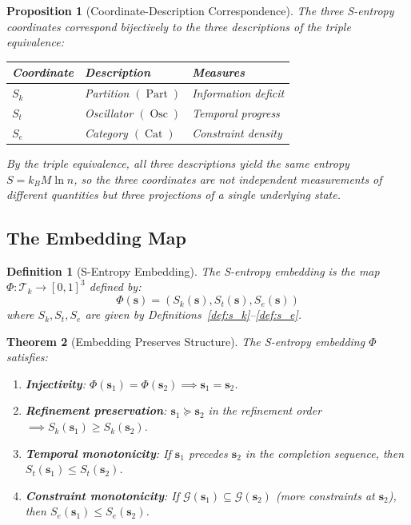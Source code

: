 \documentclass[12pt,twocolumn]{article}
\newtheorem{theorem}{Theorem}[section]
\newtheorem{proposition}[theorem]{Proposition}
\newtheorem{definition}{Definition}[section]
\DeclareMathOperator{\Cat}{Cat}
\DeclareMathOperator{\Part}{Part}
\DeclareMathOperator{\Osc}{Osc}
\begin{document}
\begin{proposition}[Coordinate-Description Correspondence]
\label{prop:correspondence}
The three S-entropy coordinates correspond bijectively to the three descriptions of the triple equivalence:
\begin{center}
\begin{tabular}{lll}
\toprule
Coordinate & Description & Measures \\
\midrule
$S_k$ & Partition $(\Part)$ & Information deficit \\
$S_t$ & Oscillator $(\Osc)$ & Temporal progress \\
$S_e$ & Category $(\Cat)$ & Constraint density \\
\bottomrule
\end{tabular}
\end{center}
By the triple equivalence, all three descriptions yield the same entropy $S = k_B M \ln n$, so the three coordinates are not independent measurements of different quantities but three projections of a single underlying state.
\end{proposition}

\subsection{The Embedding Map}

\begin{definition}[S-Entropy Embedding]
\label{def:embedding}
The \emph{S-entropy embedding} is the map $\Phi: \mathcal{T}_k \to [0,1]^3$ defined by:
\begin{equation}
\label{eq:embedding}
\Phi(\mathbf{s}) = (S_k(\mathbf{s}), S_t(\mathbf{s}), S_e(\mathbf{s}))
\end{equation}
where $S_k, S_t, S_e$ are given by Definitions~\ref{def:s_k}--\ref{def:s_e}.
\end{definition}

\begin{theorem}[Embedding Preserves Structure]
\label{thm:embedding_structure}
The S-entropy embedding $\Phi$ satisfies:
\begin{enumerate}
\item \textbf{Injectivity}: $\Phi(\mathbf{s}_1) = \Phi(\mathbf{s}_2) \implies \mathbf{s}_1 = \mathbf{s}_2$.
\item \textbf{Refinement preservation}: $\mathbf{s}_1 \succeq \mathbf{s}_2$ in the refinement order $\implies S_k(\mathbf{s}_1) \geq S_k(\mathbf{s}_2)$.
\item \textbf{Temporal monotonicity}: If $\mathbf{s}_1$ precedes $\mathbf{s}_2$ in the completion sequence, then $S_t(\mathbf{s}_1) \leq S_t(\mathbf{s}_2)$.
\item \textbf{Constraint monotonicity}: If $\mathcal{G}(\mathbf{s}_1) \subseteq \mathcal{G}(\mathbf{s}_2)$ (more constraints at $\mathbf{s}_2$), then $S_e(\mathbf{s}_1) \leq S_e(\mathbf{s}_2)$.
\end{enumerate}
\end{theorem}
\end{document}
